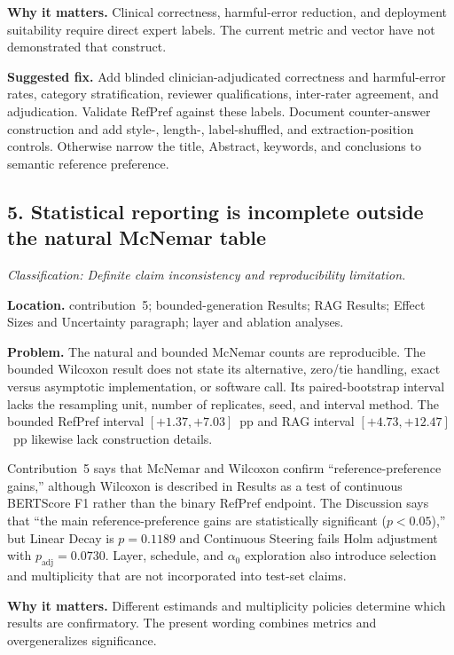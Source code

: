 \documentclass[11pt]{article}
\newcommand{\findinglabel}[1]{\textbf{#1}}
\newcommand{\classification}[1]{\textit{Classification: #1.}}
\begin{document}
\findinglabel{Why it matters.} Clinical correctness, harmful-error reduction, and deployment suitability require direct expert labels.  The current metric and vector have not demonstrated that construct.

\findinglabel{Suggested fix.} Add blinded clinician-adjudicated correctness and harmful-error rates, category stratification, reviewer qualifications, inter-rater agreement, and adjudication.  Validate RefPref against these labels.  Document counter-answer construction and add style-, length-, label-shuffled, and extraction-position controls.  Otherwise narrow the title, Abstract, keywords, and conclusions to semantic reference preference.

\subsection*{5. Statistical reporting is incomplete outside the natural McNemar table}

\classification{Definite claim inconsistency and reproducibility limitation}

\findinglabel{Location.} contribution~5; bounded-generation Results; RAG Results; Effect Sizes and Uncertainty paragraph; layer and ablation analyses.

\findinglabel{Problem.} The natural and bounded McNemar counts are reproducible.  The bounded Wilcoxon result does not state its alternative, zero/tie handling, exact versus asymptotic implementation, or software call.  Its paired-bootstrap interval lacks the resampling unit, number of replicates, seed, and interval method.  The bounded RefPref interval $[+1.37,+7.03]$~pp and RAG interval $[+4.73,+12.47]$~pp likewise lack construction details.

Contribution~5 says that McNemar and Wilcoxon confirm ``reference-preference gains,'' although Wilcoxon is described in Results as a test of continuous BERTScore F1 rather than the binary RefPref endpoint.  The Discussion says that ``the main reference-preference gains are statistically significant ($p<0.05$),'' but Linear Decay is $p=0.1189$ and Continuous Steering fails Holm adjustment with $p_{\mathrm{adj}}=0.0730$.  Layer, schedule, and $\alpha_0$ exploration also introduce selection and multiplicity that are not incorporated into test-set claims.

\findinglabel{Why it matters.} Different estimands and multiplicity policies determine which results are confirmatory.  The present wording combines metrics and overgeneralizes significance.
\end{document}
